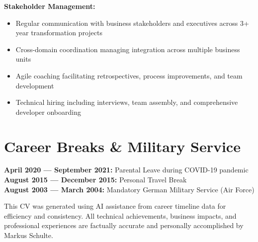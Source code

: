 \documentclass[10pt,a4paper]{article}
\begin{document}
\textbf{Stakeholder Management:}
\begin{itemize}[leftmargin=12pt,itemsep=1pt]
\item Regular communication with business stakeholders and executives across 3+ year transformation projects
\item Cross-domain coordination managing integration across multiple business units
\item Agile coaching facilitating retrospectives, process improvements, and team development
\item Technical hiring including interviews, team assembly, and comprehensive developer onboarding
\end{itemize}

\section{Career Breaks \& Military Service}

\textbf{April 2020 — September 2021:} Parental Leave during COVID-19 pandemic\\
\textbf{August 2015 — December 2015:} Personal Travel Break\\
\textbf{August 2003 — March 2004:} Mandatory German Military Service (Air Force)

\vspace{12pt}

{\footnotesize\textcolor{mediumgray}{
This CV was generated using AI assistance from career timeline data for efficiency and consistency. All technical achievements, business impacts, and professional experiences are factually accurate and personally accomplished by Markus Schulte.
}}
\end{document}
